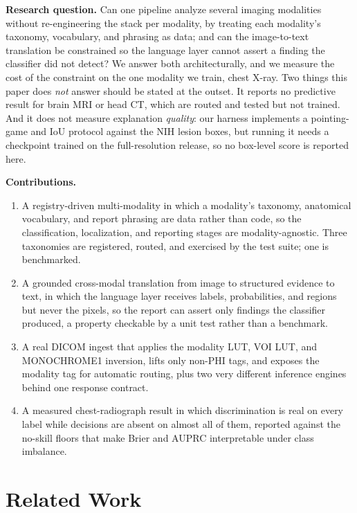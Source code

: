 \documentclass[conference]{IEEEtran}
\newcommand{\rih}[1]{\textbf{#1}\enspace\ignorespaces}
\begin{document}
\rih{Research question.} Can one pipeline analyze several imaging modalities without
re-engineering the stack per modality, by treating each modality's taxonomy,
vocabulary, and phrasing as data; and can the image-to-text translation be
constrained so the language layer cannot assert a finding the classifier did not
detect? We answer both architecturally, and we measure the cost of the constraint
on the one modality we train, chest X-ray. Two things this paper does \emph{not}
answer should be stated at the outset. It reports no predictive result for brain MRI
or head CT, which are routed and tested but not trained. And it does not measure
explanation \emph{quality}: our harness implements a pointing-game and IoU protocol
against the NIH lesion boxes, but running it needs a checkpoint trained on the
full-resolution release, so no box-level score is reported here.

\rih{Contributions.}
\begin{enumerate}[leftmargin=1.3em,itemsep=1pt,topsep=2pt]
  \item A registry-driven multi-modality in which a modality's taxonomy, anatomical
  vocabulary, and report phrasing are data rather than code, so the classification,
  localization, and reporting stages are modality-agnostic. Three taxonomies are
  registered, routed, and exercised by the test suite; one is benchmarked.
  \item A grounded cross-modal translation from image to structured evidence to
  text, in which the language layer receives labels, probabilities, and regions but
  never the pixels, so the report can assert only findings the classifier produced,
  a property checkable by a unit test rather than a benchmark.
  \item A real DICOM ingest that applies the modality LUT, VOI LUT, and MONOCHROME1
  inversion, lifts only non-PHI tags, and exposes the modality tag for automatic
  routing, plus two very different inference engines behind one response contract.
  \item A measured chest-radiograph result in which discrimination is real on every
  label while decisions are absent on almost all of them, reported against the
  no-skill floors that make Brier and AUPRC interpretable under class imbalance.
\end{enumerate}

\section{Related Work}
\label{sec:litreview}
\end{document}
